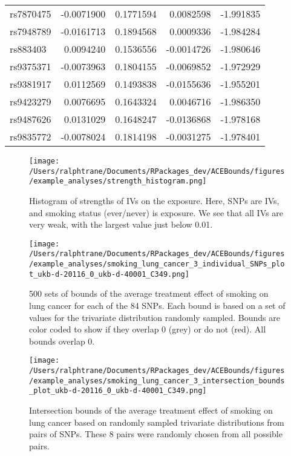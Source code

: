 \documentclass[
]{article}
\theoremstyle{plain}
\begin{document}
\begin{longtable}[t]{lrrrr}
rs7870475 & -0.0071900 & 0.1771594 & 0.0082598 & -1.991835\\
rs7948789 & -0.0161713 & 0.1894568 & 0.0009336 & -1.984284\\
rs883403 & 0.0094240 & 0.1536556 & -0.0014726 & -1.980646\\
rs9375371 & -0.0073963 & 0.1804155 & -0.0069852 & -1.972929\\
\addlinespace
rs9381917 & 0.0112569 & 0.1493838 & -0.0155636 & -1.955201\\
rs9423279 & 0.0076695 & 0.1643324 & 0.0046716 & -1.986350\\
rs9487626 & 0.0131029 & 0.1648247 & -0.0136868 & -1.978168\\
rs9835772 & -0.0078024 & 0.1814198 & -0.0031275 & -1.978401\\*
\end{longtable}

\begin{figure}[H]
 \center
 \texttt{[image: /Users/ralphtrane/Documents/RPackages\_dev/ACEBounds/figures/example\_analyses/strength\_histogram.png]}
 \caption{Histogram of strengths of IVs on the exposure. Here, SNPs are IVs, and smoking status (ever/never) is exposure. We see that all IVs are very weak, with the largest value just below 0.01.}
 \label{fig:strength_histogram}
\end{figure}

\begin{figure}[H]
  \center
  \texttt{[image: /Users/ralphtrane/Documents/RPackages\_dev/ACEBounds/figures/example\_analyses/smoking\_lung\_cancer\_3\_individual\_SNPs\_plot\_ukb-d-20116\_0\_ukb-d-40001\_C349.png]}
    \caption{500 sets of bounds of the average treatment effect of smoking on lung cancer for each of the 84 SNPs. Each bound is based on a set of values for the trivariate distribution randomly sampled. Bounds are color coded to show if they overlap 0 (grey) or do not (red). All bounds overlap 0.}
    \label{fig:smoking_on_lung_cancer_tri_bounds_all}
\end{figure}

\begin{figure}[H]
  \center
  \texttt{[image: /Users/ralphtrane/Documents/RPackages\_dev/ACEBounds/figures/example\_analyses/smoking\_lung\_cancer\_3\_intersection\_bounds\_plot\_ukb-d-20116\_0\_ukb-d-40001\_C349.png]}
  \caption{Intersection bounds of the average treatment effect of smoking on lung cancer based on randomly sampled trivariate distributions from pairs of SNPs. These 8 pairs were randomly chosen from all possible pairs.}
  \label{fig:smoking_on_lung_cancer_intersections}
\end{figure}
\end{document}
